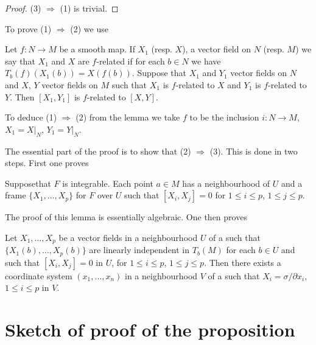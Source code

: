 \begin{proof}
(3) $\Rightarrow$ (1) is trivial.
\end{proof}

To prove (1) $\Rightarrow$ (2) we use

\begin{lemma}\label{chap8-lem8.2}
Let $f:N\to M$ be a smooth map. If $X_{1}$ (resp. $X$), a vector field on $N$ (resp. $M$) we say that $X_{1}$ and $X$ are $f$-related if for each $b\in N$ we have $T_{b}(f)(X_{1}(b))=X(f(b))$. Suppose that $X_{1}$ and $Y_{1}$ vector fields on $N$ and $X$, $Y$ vector fields on $M$ such that $X_{1}$ is $f$-related to $X$ and $Y_{1}$ is $f$-related to $Y$. Then $[X_{1},Y_{1}]$ is $f$-related to $[X,Y]$.
\end{lemma}

To deduce (1) $\Rightarrow$ (2) from the lemma we take $f$ to be the inclusion $i:N\to M$, $X_{1}=X|_{N}$, $Y_{1}=Y|_{N}$.

The essential part of the proof is to show that (2) $\Rightarrow$ (3). This is done in two steps. First one proves

\begin{lemma}\label{chap8-lem8.3}
Suppose\pageoriginale that $F$ is integrable. Each point $a\in M$ has a neighbourhood of $U$ and a frame $\{X_{1},\ldots,X_{p}\}$ for $F$ over $U$ such that $[X_{i},X_{j}]=0$ for $1\leq i\leq p$, $1\leq j\leq p$.
\end{lemma}

The proof of this lemma is essentially algebraic. One then proves

\begin{proposition}\label{chap8-prop8.4}
Let $X_{1},\ldots,X_{p}$ be a vector fields in a neighbourhood $U$ of a such that $\{X_{1}(b),\ldots,X_{p}(b)\}$ are linearly independent in $T_{b}(M)$ for each $b\in U$ and such that $[X_{i},X_{j}]=0$ in $U$, for $1\leq i\leq p$, $1\leq j\leq p$. Then there exists a coordinate system $(x_{1},\ldots,x_{n})$ in a neighbourhood $V$ of a such that $X_{i}=\sigma/\partial x_{i}$, $1\leq i\leq p$ in $V$.
\end{proposition}

\section*{Sketch of proof of the proposition}

